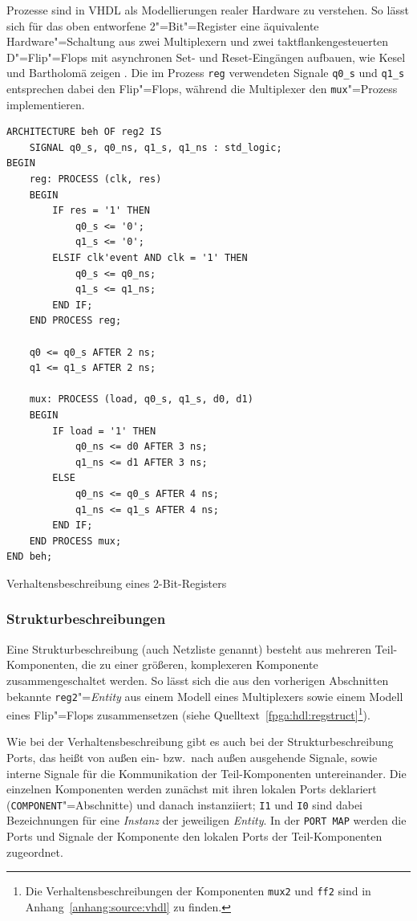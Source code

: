 Prozesse sind in VHDL als Modellierungen realer Hardware zu verstehen. So lässt
sich für das oben entworfene 2"=Bit"=Register eine äquivalente
Hardware"=Schaltung aus zwei Multiplexern und zwei taktflankengesteuerten
D"=Flip"=Flops mit asynchronen Set- und Reset-Eingängen aufbauen, wie Kesel und
Bartholomä zeigen \cite[siehe][32]{kesel2013}. Die im Prozess \texttt{reg}
verwendeten Signale \texttt{q0\_s} und \texttt{q1\_s} entsprechen dabei den
Flip"=Flops, während die Multiplexer den \texttt{mux}"=Prozess implementieren.
\cite[vgl.][31]{kesel2013}


\begin{code}
    \begin{verbatim}
ARCHITECTURE beh OF reg2 IS
    SIGNAL q0_s, q0_ns, q1_s, q1_ns : std_logic;
BEGIN
    reg: PROCESS (clk, res)
    BEGIN
        IF res = '1' THEN
            q0_s <= '0';
            q1_s <= '0';
        ELSIF clk'event AND clk = '1' THEN
            q0_s <= q0_ns;
            q1_s <= q1_ns;
        END IF;
    END PROCESS reg;

    q0 <= q0_s AFTER 2 ns;
    q1 <= q1_s AFTER 2 ns;

    mux: PROCESS (load, q0_s, q1_s, d0, d1)
    BEGIN
        IF load = '1' THEN
            q0_ns <= d0 AFTER 3 ns;
            q1_ns <= d1 AFTER 3 ns;
        ELSE
            q0_ns <= q0_s AFTER 4 ns;
            q1_ns <= q1_s AFTER 4 ns;
        END IF;
    END PROCESS mux;
END beh;
    \end{verbatim}
    \caption{Verhaltensbeschreibung eines 2-Bit-Registers \cite[siehe][28]{kesel2013}}
    \label{fpga:hdl:regbeh}
\end{code}

\subsubsection{Strukturbeschreibungen}

Eine Strukturbeschreibung (auch Netzliste genannt) besteht aus mehreren
Teil-Komponenten, die zu einer größeren, komplexeren Komponente 
zusammengeschaltet werden. So lässt sich die aus den vorherigen Abschnitten
bekannte \texttt{reg2}"=\textit{Entity} aus einem Modell eines Multiplexers
sowie einem Modell eines Flip"=Flops zusammensetzen (siehe
Quelltext~\ref{fpga:hdl:regstruct}\footnote{Die Verhaltensbeschreibungen der
Komponenten \texttt{mux2} und \texttt{ff2} sind in
Anhang~\ref{anhang:source:vhdl} zu finden.}).

Wie bei der Verhaltensbeschreibung gibt es auch bei der Strukturbeschreibung
Ports, das heißt von außen ein- bzw.\ nach außen ausgehende Signale, sowie
interne Signale für die Kommunikation der Teil-Komponenten untereinander. Die
einzelnen Komponenten werden zunächst mit ihren lokalen Ports deklariert
(\texttt{COMPONENT}"=Abschnitte) und danach instanziiert; \texttt{I1} und
\texttt{I0} sind dabei Bezeichnungen für eine \textit{Instanz} der jeweiligen
\textit{Entity}. In der \texttt{PORT MAP} werden die Ports und Signale der
Komponente den lokalen Ports der Teil-Komponenten zugeordnet.
\cite[vgl.][37]{kesel2013}

